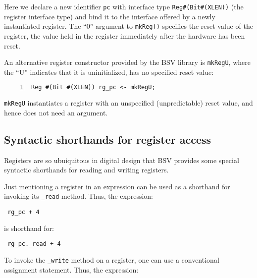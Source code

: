 Here we declare a new identifier \verb|pc| with interface type
\verb|Reg#(Bit#(XLEN))| (the register interface type) and bind it to
the interface offered by a newly instantiated register.  The ``0''
argument to \verb|mkReg()| specifies the reset-value of the register,
{\ie} the value held in the register immediately after the hardware
has been reset.

An alternative register constructor provided by the BSV library is
{\tt mkRegU}, where the ``U'' indicates that it is uninitialized,
{\ie} has no specified reset value:


{\small
\begin{Verbatim}[frame=single, numbers=left]
   Reg #(Bit #(XLEN)) rg_pc <- mkRegU;
\end{Verbatim}
}

\verb|mkRegU| instantiates a register with an unspecified
(unpredictable) reset value, and hence does not need an argument.


\subsection{Syntactic shorthands for register access}

\label{Sec_Register_syntactic_shorthands}


Registers are so ubuiquitous in digital design that BSV provides some
special syntactic shorthands for reading and writing registers.

Just mentioning a register in an expression can be used as a shorthand
for invoking its \verb|_read| method.  Thus, the expression:

\begin{tabbing}\small\tt
\hmmmm  rg\_pc + 4
\end{tabbing}

is shorthand for:

\begin{tabbing}\small\tt
\hmmmm  rg\_pc.\_read + 4
\end{tabbing}

To invoke the \verb|_write| method on a register, one can use a
conventional assignment statement.  Thus, the expression:

